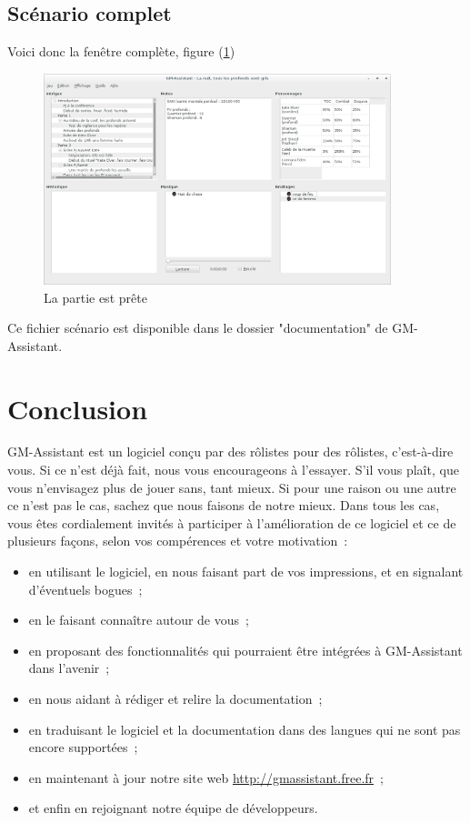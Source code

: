 \documentclass[a4paper,12pt]{article}
\newcommand*{\GMA}{GM-Assistant\xspace}
\begin{document}
\subsection{Scénario complet}
Voici donc la fenêtre complète, figure (\ref{scenario_complet})
\begin{figure}[h!]
    \includegraphics[width=0.9\textwidth]{scenario_complet}
    \caption{La partie est prête}
    \label{scenario_complet}
\end{figure}

Ce fichier scénario est disponible dans le dossier "documentation" de \GMA.

\section{Conclusion}\label{conclusions}
\GMA est un logiciel conçu par des rôlistes pour des rôlistes, c'est-à-dire vous.
Si ce n'est déjà fait, nous vous encourageons à l'essayer.
S'il vous plaît, que vous n'envisagez plus de jouer sans, tant mieux.
Si pour une raison ou une autre ce n'est pas le cas, sachez que nous faisons de notre mieux.
Dans tous les cas, vous êtes cordialement invités à participer à l'amélioration de ce logiciel et ce de plusieurs façons, selon vos compérences et votre motivation~:
\begin{itemize}
    \item en utilisant le logiciel, en nous faisant part de vos impressions, et en signalant d'éventuels bogues~;
    \item en le faisant connaître autour de vous~;
    \item en proposant des fonctionnalités qui pourraient être intégrées à \GMA dans l'avenir~;
    \item en nous aidant à rédiger et relire la documentation~;
    \item en traduisant le logiciel et la documentation dans des langues qui ne sont pas encore supportées~;
    \item en maintenant à jour notre site web \url{http://gmassistant.free.fr}~;
    \item et enfin en rejoignant notre équipe de développeurs.
\end{itemize}
\end{document}
